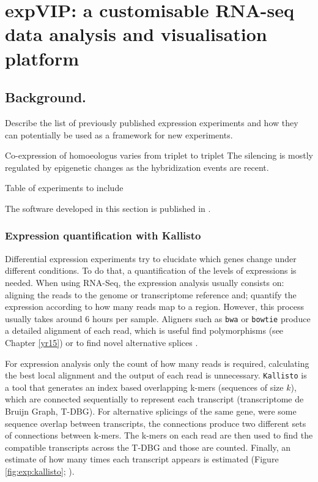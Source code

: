 
\chapter[expVIP]{expVIP: a customisable RNA-seq data analysis and visualisation platform}
\label{cha:exp}

\section{Background.}
Describe the list of previously published expression experiments and how they can potentially be used as a framework for new experiments.  

Co-expression of homoeologus varies from triplet to triplet \citep{Pfeifer2014}
The silencing is mostly regulated by epigenetic changes as the hybridization events are recent.  \citep{Bottley2006}

Table of experiments to include 

The software developed in this section is published in \citep{Borrill2016}. 

\subsection{Expression quantification with Kallisto}

Differential expression experiments try to elucidate which genes change under different conditions. 
To do that, a quantification of the levels of expressions is needed. 
When using RNA-Seq, the expression analysis usually consists on: aligning the reads to the genome or transcriptome reference and; quantify the expression according to how many reads map to a region. 
However, this process usually takes around 6 hours per sample. 
Aligners such as \texttt{bwa} or \texttt{bowtie} produce a detailed alignment of each read, which is useful find polymorphisms (see Chapter \ref{yr15}) or to find novel alternative splices \citep{Trapnell2012}. 

For expression analysis only the count of how many reads is required, calculating the best local alignment and the output of each read is unnecessary. 
\verb|Kallisto| is a tool that generates an index based overlapping k-mers (sequences of size $k$), which are connected sequentially to represent each transcript (transcriptome de Bruijn Graph, T-DBG). 
For alternative splicings of the same gene, were some sequence overlap between transcripts, the connections produce two different sets of connections between k-mers. 
The k-mers on each read are then used to find the compatible transcripts across the T-DBG and those are counted. 
Finally, an estimate of how many times each transcript appears is estimated (Figure \ref{fig:exp:kallisto}; \citealt{Bray2016}).  



